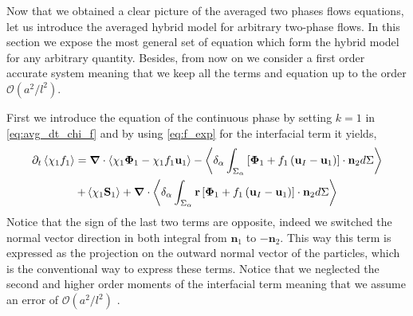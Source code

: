 
Now that we obtained a clear picture of the averaged two phases flows equations, let us introduce the averaged hybrid model for arbitrary two-phase flows. 
In this section we expose the most general set of equation which form the hybrid model for any arbitrary quantity.
Besides, from now on we consider a first order accurate system meaning that we keep all the terms and equation up to the order $\mathcal{O}\left(a^2/l^2\right)$. 

First we introduce the equation of the continuous phase by setting $k = 1$ in \ref{eq:avg_dt_chi_f} and by using \ref{eq:f_exp} for the interfacial term it yields,
\begin{multline}
    \partial_t \left<\chi_1 f_1\right>
    = \bm{\nabla} \cdot \left<\chi_1 \bm{\Phi}_1 - \chi_1 f_1 \textbf{u}_1\right>
    - \left<\delta_\alpha \int_{\Sigma_\alpha}\left[
        \mathbf{\Phi}_1
        + f_1
        \left(
            \textbf{u}_I
            - \textbf{u}_1
        \right)
    \right]
    \cdot \textbf{n}_2d\Sigma\right> \\
    + \left<\chi_1 \textbf{S}_1\right>
    +  \bm{\nabla} \cdot \left<\delta_\alpha \int_{\Sigma_\alpha} \textbf{r}\left[
        \mathbf{\Phi}_1
        + f_1
        \left(
            \textbf{u}_I
            - \textbf{u}_1
        \right)
    \right]
    \cdot \textbf{n}_2d\Sigma\right> 
    \label{eq:hybrid_avg_dt_chif}
\end{multline}
Notice that the sign of the last two terms are opposite, indeed we switched the normal vector direction in both integral from $\textbf{n}_1$ to $-\textbf{n}_2$. 
This way this term is expressed as the projection on the outward normal vector of the particles, which is the conventional way to express these terms. 
Notice that we neglected the second and higher order moments of the interfacial term meaning that we assume an error of $\mathcal{O}\left(a^2/l^2\right)$ \citep{jackson1997locally}. 

